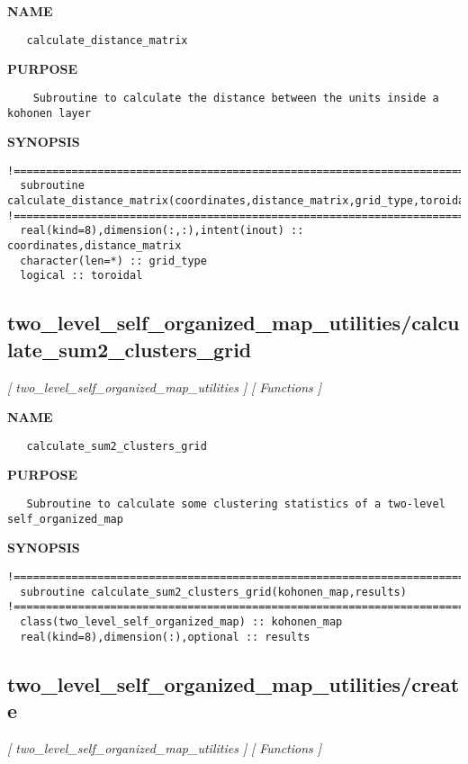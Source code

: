 \documentclass{article}
\begin{document}
\label{ch:robo65}
\label{ch:two_level_self_organized_map_utilities_calculate_distance_matrix}
\textbf{NAME}
\begin{verbatim}
   calculate_distance_matrix
\end{verbatim}
\textbf{PURPOSE}
\begin{verbatim}
    Subroutine to calculate the distance between the units inside a kohonen layer 
\end{verbatim}
\textbf{SYNOPSIS}
\begin{verbatim}
!========================================================================================
  subroutine calculate_distance_matrix(coordinates,distance_matrix,grid_type,toroidal)
!========================================================================================
  real(kind=8),dimension(:,:),intent(inout) :: coordinates,distance_matrix
  character(len=*) :: grid_type
  logical :: toroidal
\end{verbatim}
\newpage
\subsection{two\_level\_self\_organized\_map\_utilities/calculate\_sum2\_clusters\_grid}
\textsl{[ two\_level\_self\_organized\_map\_utilities ]}
\textsl{[ Functions ]}

\label{ch:robo66}
\label{ch:two_level_self_organized_map_utilities_calculate_sum2_clusters_grid}
\textbf{NAME}
\begin{verbatim}
   calculate_sum2_clusters_grid
\end{verbatim}
\textbf{PURPOSE}
\begin{verbatim}
   Subroutine to calculate some clustering statistics of a two-level self_organized_map 
\end{verbatim}
\textbf{SYNOPSIS}
\begin{verbatim}
!========================================================================================
  subroutine calculate_sum2_clusters_grid(kohonen_map,results)
!========================================================================================
  class(two_level_self_organized_map) :: kohonen_map
  real(kind=8),dimension(:),optional :: results
\end{verbatim}
\newpage
\subsection{two\_level\_self\_organized\_map\_utilities/create}
\textsl{[ two\_level\_self\_organized\_map\_utilities ]}
\textsl{[ Functions ]}
\end{document}
